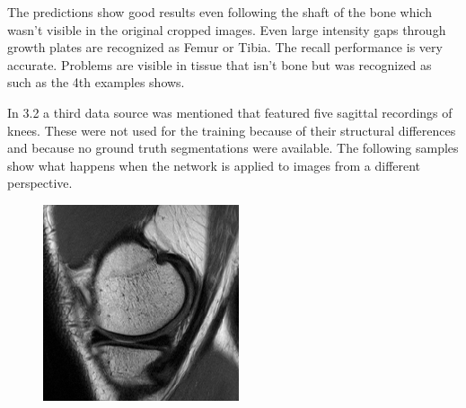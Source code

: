 The predictions show good results even following the shaft of the bone which wasn't visible in the original cropped images. Even large intensity gaps through growth plates are recognized as Femur or Tibia. The recall performance is very accurate. Problems are visible in tissue that isn't bone but was recognized as such as the 4th examples shows.

In 3.2 a third data source was mentioned that featured five sagittal recordings of knees. These were not used for the training because of their structural differences and because no ground truth segmentations were available. The following samples show what happens when the network is applied to images from a different perspective.

\begin{figure}[H]
  \includegraphics[width=\linewidth]{imgs/transfer_pers_x1.png}
\endminipage\hfill
{}

\end{figure}
